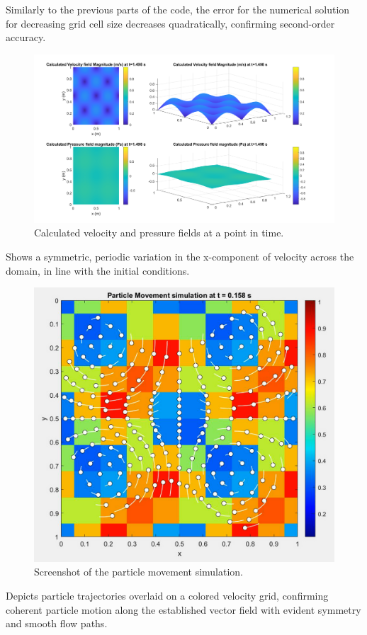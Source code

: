 Similarly to the previous parts of the code, the error for the numerical solution for decreasing grid cell size decreases quadratically, confirming second-order accuracy.

\begin{figure}[H]
    \centering
    \includegraphics[width=0.6\linewidth]{imatges/calculatedfields.png}
    \caption{Calculated velocity and pressure fields at a point in time.}
    \label{fig:calculatedfields}
\end{figure}

Shows a symmetric, periodic variation in the x-component of velocity across the domain, in line with the initial conditions.

\begin{figure}[H]
    \centering
    \includegraphics[width=0.6\linewidth]{imatges/particlemovement.png}
    \caption{Screenshot of the particle movement simulation.}
    \label{fig:particlemovement}
\end{figure}
Depicts particle trajectories overlaid on a colored velocity grid, confirming coherent particle motion along the established vector field with evident symmetry and smooth flow paths.